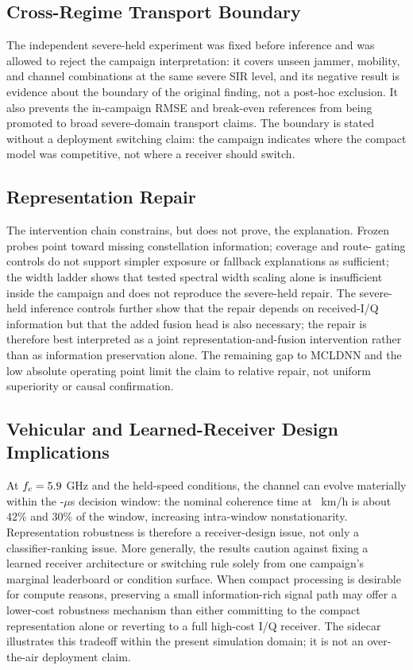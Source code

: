 \documentclass[letterpaper,journal]{IEEEtran}
\begin{document}
\subsection{Cross-Regime Transport Boundary}
The independent severe-held experiment was fixed before inference and was
allowed to reject the campaign interpretation: it covers unseen jammer,
mobility, and channel combinations at the same severe SIR level, and its
negative result is evidence about the boundary of the original finding, not a
post-hoc exclusion. It also prevents the in-campaign RMSE and break-even
references from being promoted to broad severe-domain transport claims. The
boundary is stated without a deployment switching claim: the campaign
indicates where the compact model was competitive, not where a receiver
should switch.

\subsection{Representation Repair}
The intervention chain constrains, but does not prove, the explanation. Frozen
probes point toward missing constellation information; coverage and route-
gating controls do not support simpler exposure or fallback explanations as
sufficient; the width
ladder shows that tested spectral width scaling alone is insufficient inside
the campaign and does not reproduce the severe-held repair. The severe-held
inference controls further show that the repair depends on received-I/Q
information but that the added fusion head is also necessary; the repair is
therefore best interpreted as a joint representation-and-fusion intervention
rather than as information preservation alone. The remaining gap to MCLDNN
and the low absolute operating point limit the claim to relative repair, not
uniform superiority or causal confirmation.

\subsection{Vehicular and Learned-Receiver Design Implications}
At $f_c=5.9$ GHz and the held-speed conditions, the channel can evolve
materially within the \WindowMicroseconds-$\mu$s decision window: the nominal
coherence time at \HeldSpeeds\ km/h is about $42\%$ and $30\%$ of the window,
increasing intra-window nonstationarity. Representation robustness is
therefore a receiver-design issue, not only a classifier-ranking issue. More
generally, the results caution against fixing a learned receiver architecture
or switching rule solely from one campaign's marginal leaderboard or condition
surface. When compact processing is desirable for compute reasons, preserving
a small information-rich signal path may offer a lower-cost robustness
mechanism than either committing to the compact representation alone or
reverting to a full high-cost I/Q receiver. The sidecar illustrates this
tradeoff within the present simulation domain; it is not an over-the-air
deployment claim.
\end{document}
